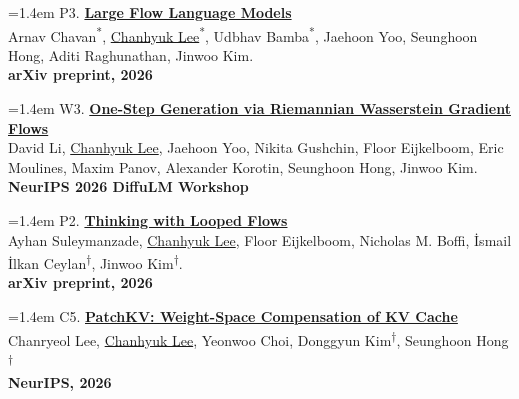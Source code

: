 \documentclass[a4paper,10pt]{extarticle}
\newcommand{\venue}[1]{\textbf{#1}}
\begin{document}
\smallskip
\noindent\begin{minipage}[t]{\linewidth}
\hangindent=1.4em
P3. \href{https://arxiv.org/abs/2610.28559}{\textbf{Large Flow Language Models}} \\[1pt]
Arnav Chavan\textsuperscript{*}, \underline{Chanhyuk Lee}\textsuperscript{*}, Udbhav Bamba\textsuperscript{*}, Jaehoon Yoo, Seunghoon Hong, Aditi Raghunathan, Jinwoo Kim. \\[3pt]
\venue{arXiv preprint, 2026}

\vspace{6pt}
\end{minipage}
\noindent\begin{minipage}[t]{\linewidth}
\hangindent=1.4em
W3. \href{https://arxiv.org/abs/2610.04454}{\textbf{One-Step Generation via Riemannian Wasserstein Gradient Flows}} \\[1pt]
David Li, \underline{Chanhyuk Lee}, Jaehoon Yoo, Nikita Gushchin, Floor Eijkelboom, Eric Moulines, Maxim Panov, Alexander Korotin, Seunghoon Hong, Jinwoo Kim. \\[3pt]
\venue{NeurIPS 2026 DiffuLM Workshop}

\vspace{6pt}
\end{minipage}
\noindent\begin{minipage}[t]{\linewidth}
\hangindent=1.4em
P2. \href{https://arxiv.org/abs/2609.11801}{\textbf{Thinking with Looped Flows}} \\[1pt]
Ayhan Suleymanzade, \underline{Chanhyuk Lee}, Floor Eijkelboom, Nicholas M. Boffi, \.Ismail \.Ilkan Ceylan\textsuperscript{\ensuremath{\dagger}}, Jinwoo Kim\textsuperscript{\ensuremath{\dagger}}. \\[3pt]
\venue{arXiv preprint, 2026}

\vspace{6pt}
\end{minipage}
\noindent\begin{minipage}[t]{\linewidth}
\hangindent=1.4em
C5. \href{https://arxiv.org/abs/2609.39329}{\textbf{PatchKV: Weight-Space Compensation of KV Cache}} \\[1pt]
Chanryeol Lee, \underline{Chanhyuk Lee}, Yeonwoo Choi, Donggyun Kim\textsuperscript{\ensuremath{\dagger}}, Seunghoon Hong\textsuperscript{\ensuremath{\dagger}}\\[3pt]
\venue{NeurIPS, 2026}

\vspace{6pt}
\end{minipage}
\end{document}
